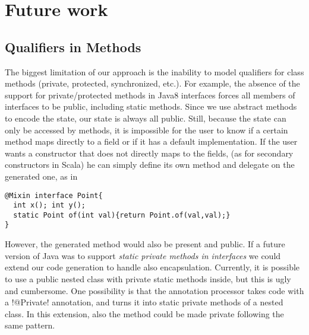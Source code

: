 \section{Future work}\label{sec:futurework}

\subsection{Qualifiers in Methods} %
The biggest limitation of our approach is the inability to model qualifiers
for class methods (private, protected, synchronized, etc.). For example, the absence
of the support for private/protected methods in Java8 interfaces forces all
members of interfaces to be public, including static methods. Since we use
abstract methods to encode the state, our state is always all public. Still, because 
the state can only be accessed by methods, it 
is impossible for the user to know if a certain method maps directly to a field
or if it has a default implementation.  If the user wants a constructor that
does not directly maps to the fields, (as for secondary constructors in Scala)
he can simply define its own \Q@of@ method and delegate on the generated one, as
in
\begin{lstlisting}
@Mixin interface Point{
  int x(); int y();
  static Point of(int val){return Point.of(val,val);}  
}
\end{lstlisting}
However, the generated \Q@of@ method would also be present and public.  If a
future version of Java was to support \emph{static private methods in
  interfaces} we could extend our code generation to handle also encapsulation.
Currently, it is possible to use a public nested class with private static
methods inside, but this is ugly and cumbersome. One possibility is that the
annotation processor takes code with a \Q!@Private! annotation, and turns it into
static private methods of a nested class. In this extension, also the \Q@of@
method could be made private following the same pattern.

